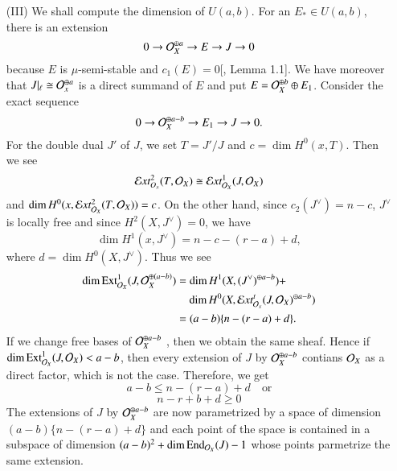 \begin{itemize}
\item[(III)] We shall compute the dimension of $U(a,b)$. For an $E_{*} \in U(a, b)$, there is an extension
$$
0 \rightarrow \mathcal{O}_{X}^{\oplus a} \rightarrow E \rightarrow J \rightarrow 0
$$
because $E$ is $\mu$-semi-stable and $c_{1}(E) =0$[\cite{art12-key6}, Lemma 1.1]. We have moreover that $ J|_{\ell}\cong \mathcal{O}_{x}^{\oplus a}$ is a direct summand of $E$ and put $E=\mathcal{O}_{X}^{\oplus b} \oplus E_{1}$. Consider the exact sequence
$$
0\rightarrow \mathcal{O}_{X}^{\oplus a-b} \rightarrow E_{1} \rightarrow J \rightarrow 0.
$$
For the double dual $J'$ of $J$, we set $T= J'/J$ and $c =\dim H^{0}(x, T)$. Then we see
$$
\mathcal{E} xt_{O_{x}}^{2} (T, \mathcal{O}_{X})\cong  \mathcal{E} xt_{\mathcal{O}_{X}}^{1} (J, \mathcal{O}_{X})
$$
and $\dim H^{0}(x, \mathcal{E} xt_{\mathcal{O}_{X}}^{2} (T, \mathcal{O}_{X}))=c$. On the other hand, since $c_{2}(J^{\vee})=n-c$, $J^{\vee}$ is locally free and since $H^{2}(X, J^{\vee})=0$, we have
$$
\dim H^{1}(x, J^{\vee}) = n-c-(r-a) +d,
$$
where $d=\dim H^{0}(X, J^{\vee})$. Thus we see
\begin{equation*}
\begin{split}
\dim \operatorname{Ext}_{\mathcal{O}_{X}}^{1}(J, \mathcal{O}_{X}^{\oplus (a-b)})& = \dim H^{1}(X, (J^{\vee})^{\oplus a-b}) +\\
            &\quad \dim H^{0}(X, \mathcal{E} xt_{\mathcal{O}_{x}}^{t}(J, \mathcal{O}_{X})^{\oplus a-b})\\
            &= (a-b) \{n-(r-a) + d \}.            
\end{split}
\end{equation*}
If we change free bases of $\mathcal{O}_{X}^{\oplus a-b}$ , then we obtain the same sheaf. Hence if $\dim \operatorname{Ext}_{\mathcal{O}_{X}}^{1} (J, \mathcal{O}_{X}) < a-b$, then every extension of $J$ by $\mathcal{O}_{X}^{\oplus a-b}$ contians $\mathcal{O}_{X}$ as a direct factor, which is not the case. Therefore, we get
$$
a-b \leq n-(r-a)+d \quad \text{or}
$$
$$
n-r + b + d \geq 0
$$
The extensions of $J$ by $\mathcal{O}_{X}^{\oplus a-b}$ are now parametrized by a space of dimension $(a-b)\{n-(r-a) + d\}$ and each point of the space is contained in a subspace of dimension $(a-b)^{2} + \dim \operatorname{End}_{\mathcal{O}_{X}}(J)-1$ whose points parmetrize the same extension.


\end{itemize}
